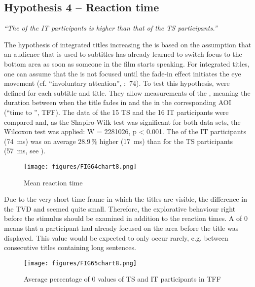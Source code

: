 \subsection{Hypothesis 4 – Reaction time}\label{sec:8.1.4}

\textit{“The  of the IT participants is higher than that of the TS participants.”}
\bigskip

The hypothesis of integrated titles increasing the  is based on the assumption that an audience that is used to subtitles has already learned to switch focus to the bottom area as soon as someone in the film starts speaking. For integrated titles, one can assume that the  is not focused until the fade-in effect initiates the eye movement (cf. “involuntary attention”, \citealt{prinzmetal2005}:~74). To test this hypothesis,  were defined for each subtitle and title. They allow measurements of the , meaning the duration between when the title fades in and the  in the corresponding AOI (“time to ”, TFF). The data of the 15 TS and the 16 IT participants were compared and, as the Shapiro-Wilk test was significant for both data sets, the Wilcoxon test was applied: W = 2281026, p < 0.001. The  of the IT participants (74~ms) was on average 28.9\,\% higher (17~ms) than for the TS participants (57~ms, see ).

\begin{figure}
\texttt{[image: figures/FIG64chart8.png]}
\caption{Mean reaction time}
\label{fig:FIG64chart8}
\end{figure}

Due to the very short time frame in which the titles are visible, the difference in the TVD and  seemed quite small. Therefore, the explorative behaviour right before the stimulus should be examined in addition to the reaction times. A  of 0 means that a participant had already focused on the area before the title was displayed. This value would be expected to only occur rarely, e.g. between consecutive titles containing long sentences.

\begin{figure}
\texttt{[image: figures/FIG65chart8.png]}
\caption{Average percentage of 0 values of TS and IT participants in TFF}
\label{fig:FIG65chart8}
\end{figure}


